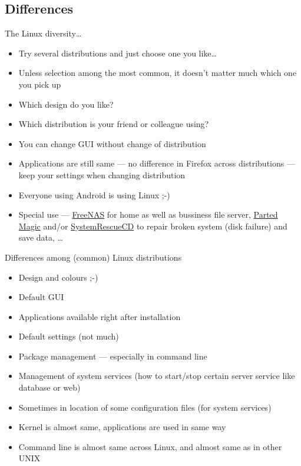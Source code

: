 \documentclass[hyperref={bookmarks=true, unicode=true, colorlinks=true, pdftitle={Linux, command line and MetaCentrum}, plainpages=false, pdfauthor={Vojtech Zeisek}, pdfsubject={Course about use of Linux command line, writing shell scripts and using MetaCentrum of CESNET}, pdfcreator={XeLaTeX, http://www.xelatex.org/}, pdfkeywords={Linux, GNU, BASH, shell, command line, MetaCentrum}, linkcolor=Sienna, anchorcolor=black, citecolor=green, filecolor=magenta, menucolor=Sienna, urlcolor=cyan, pdftex}, compress, ucs, xelatex, xcolor=svgnames, 11pt]{beamer}
\begin{document}
\subsection{Differences}

\begin{frame}{The Linux diversity\ldots}
\begin{itemize}
  \item Try several distributions and just choose one you like\ldots
  \item Unless selection among the most common, it doesn't matter much which one you pick up
  \item Which design do you like?
  \item Which distribution is your friend or colleague using?
  \item You can change GUI without change of distribution
  \item Applications are still same --- no difference in Firefox across distributions --- keep your settings when changing distribution
  \item Everyone using Android is using Linux ;-)
  \item Special use --- \href{http://www.freenas.org/}{FreeNAS} for home as well as bussiness file server, \href{http://partedmagic.com/}{Parted Magic} and/or \href{http://www.sysresccd.org/}{SystemRescueCD} to repair broken system (disk failure) and save data, \ldots
\end{itemize}
\end{frame}

\begin{frame}{Differences among (common) Linux distributions}
\begin{itemize}
  \item Design and colours ;-)
  \item Default GUI
  \item Applications available right after installation
  \item Default settings (not much)
  \item Package management --- especially in command line
  \item Management of system services (how to start/stop certain server service like database or web)
  \item Sometimes in location of some configuration files (for system services)
  \item Kernel is almost same, applications are used in same way
  \item Command line is almost same across Linux, and almost same as in other UNIX
\end{itemize}
\end{frame}
\end{document}
